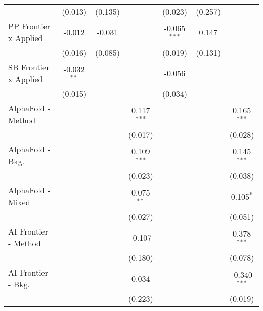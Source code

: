 \begin{tabular}{lcccccc}
                                  & (0.013)        & (0.135)        &                & (0.023)        & (0.257)        &   \\   
   PP Frontier x Applied          & -0.012         & -0.031         &                & -0.065$^{***}$ & 0.147          &   \\   
                                  & (0.016)        & (0.085)        &                & (0.019)        & (0.131)        &   \\   
   SB Frontier x Applied          & -0.032$^{**}$  &                &                & -0.056         &                &   \\   
                                  & (0.015)        &                &                & (0.034)        &                &   \\   
   AlphaFold - Method             &                &                & 0.117$^{***}$  &                &                & 0.165$^{***}$\\   
                                  &                &                & (0.017)        &                &                & (0.028)\\   
   AlphaFold - Bkg.               &                &                & 0.109$^{***}$  &                &                & 0.145$^{***}$\\   
                                  &                &                & (0.023)        &                &                & (0.038)\\   
   AlphaFold - Mixed              &                &                & 0.075$^{**}$   &                &                & 0.105$^{*}$\\   
                                  &                &                & (0.027)        &                &                & (0.051)\\   
   AI Frontier - Method           &                &                & -0.107         &                &                & 0.378$^{***}$\\   
                                  &                &                & (0.180)        &                &                & (0.078)\\   
   AI Frontier - Bkg.             &                &                & 0.034          &                &                & -0.340$^{***}$\\   
                                  &                &                & (0.223)        &                &                & (0.019)\\   

\end{tabular}
